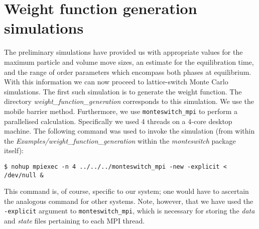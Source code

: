 \documentclass{report}
\begin{document}
\section{Weight function generation simulations}
The preliminary simulations have provided us with appropriate values for the maximum particle and volume move sizes, an estimate for
the equilibration time, and the range of order parameters which encompass both phases at equilibrium. With this information we can
now proceed to lattice-switch Monte Carlo simulations. The first such simulation is to generate the weight function. The directory
\emph{weight\_function\_generation} corresponds to this simulation. We use the mobile barrier method. Furthermore, we use \texttt{monteswitch\_mpi}
to perform a parallelised calculation. Specifically we used 4 threads on a 4-core desktop machine. The following command was used
to invoke the simulation (from within the \emph{Examples/weight\_function\_generation} within the \emph{monteswitch} package itself):
\begin{verbatim}
$ nohup mpiexec -n 4 ../../../monteswitch_mpi -new -explicit < /dev/null &
\end{verbatim}
This command is, of course, specific to our system; one would have to ascertain the analogous command for other systems. Note, however,
that we have used the \texttt{-explicit} argument to \texttt{monteswitch\_mpi}, which is necessary for storing the \emph{data} and \emph{state} 
files pertaining to each MPI thread.
\end{document}
